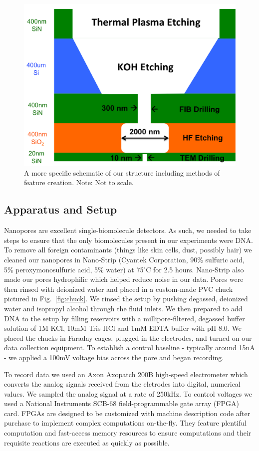 \documentclass[aps,prl,preprint,groupedaddress]{revtex4}
\begin{document}
\begin{figure}
\centering
\includegraphics[width=.45\textwidth]{figures/structure-schematic}
\caption{A more specific schematic of our structure including methods of feature creation. Note: Not to scale.}
\label{fig:structure-schematic}
\end{figure}

\subsection{Apparatus and Setup}

Nanopores are excellent single-biomolecule detectors.
As such, we needed to take steps to ensure that the only biomolecules present in our experiments were DNA.
To remove all foreign contaminants (things like skin cells, dust, possibly hair) we cleaned our nanopores in Nano-Strip (Cyantek  Corporation, 90\% sulfuric acid, 5\% peroxymonosulfuric acid, 5\% water) at 75$^\circ$C for 2.5 hours.
Nano-Strip also made our pores hydrophilic which helped reduce noise in our data.
Pores were then rinsed with deionized water and placed in a custom-made PVC chuck pictured in Fig.~\ref{fig:chuck}.
We rinsed the setup by pushing degassed, deionized water and isopropyl alcohol through the fluid inlets.
We then prepared to add DNA to the setup by filling reservoirs with a millipore-filtered, degassed buffer solution of 1M KCl, 10mM Tris-HCl and 1mM EDTA buffer with pH 8.0.
We placed the chucks in Faraday cages, plugged in the electrodes, and turned on our data collection equipment.
To establish a control baseline - typically around 15nA - we applied a 100mV voltage bias across the pore and began recording.

To record data we used an Axon Axopatch 200B high-speed electrometer which converts the analog signals received from the elctrodes into digital, numerical values.
We sampled the analog signal at a rate of 250kHz.
To control voltages we used a National Instruments SCB-68 field-programmable gate array (FPGA) card.
FPGAs are designed to be customized with machine description code after purchase to implement complex computations on-the-fly.
They feature plentiful computation and fast-access memory resources to ensure computations and their requisite reactions are executed as quickly as possible.
\end{document}
